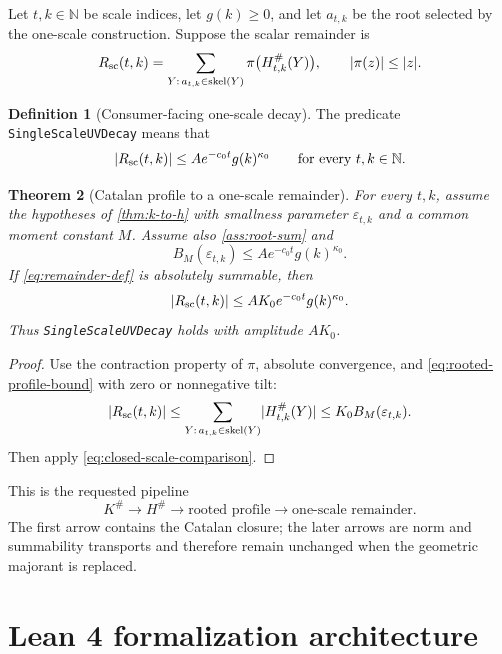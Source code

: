 \documentclass[11pt,a4paper]{article}
\newtheorem{theorem}{Theorem}[section]
\theoremstyle{definition}
\newtheorem{definition}[theorem]{Definition}
\newcommand{\skel}{\operatorname{skel}}
\newcommand{\eps}{\varepsilon}
\newcommand{\Hsharp}{H^{\#}}
\newcommand{\Ksharp}{K^{\#}}
\newcommand{\NN}{\mathbb N}
\DeclarePairedDelimiter{\abs}{\lvert}{\rvert}
\begin{document}
Let $t,k\in\NN$ be scale indices, let $g(k)\ge0$, and let $a_{t,k}$ be the root selected
by the one-scale construction.  Suppose the scalar remainder is
\begin{equation}
  R_{\mathrm{sc}}(t,k)
  =\sum_{Y:\,a_{t,k}\in\skel(Y)}
      \pi\bigl(\Hsharp_{t,k}(Y)\bigr),
  \qquad \abs{\pi(z)}\le\abs{z}.
  \label{eq:remainder-def}
\end{equation}

\begin{definition}[Consumer-facing one-scale decay]
The predicate \texttt{SingleScaleUVDecay} means that
\begin{equation}
  \abs{R_{\mathrm{sc}}(t,k)}
  \le A e^{-c_0t}g(k)^{\kappa_0}
  \qquad\text{for every }t,k\in\NN.
  \label{eq:ssuv}
\end{equation}
\end{definition}

\begin{theorem}[Catalan profile to a one-scale remainder]
\label{thm:single-scale}
For every $t,k$, assume the hypotheses of \cref{thm:k-to-h} with smallness parameter
$\eps_{t,k}$ and a common moment constant $M$.  Assume also \cref{ass:root-sum} and
\[
  B_M(\eps_{t,k})\le A e^{-c_0t}g(k)^{\kappa_0}.
  \label{eq:closed-scale-comparison}
\]
If \eqref{eq:remainder-def} is absolutely summable, then
\begin{equation}
  \abs{R_{\mathrm{sc}}(t,k)}
  \le AK_0e^{-c_0t}g(k)^{\kappa_0}.
  \label{eq:remainder-bound}
\end{equation}
Thus \texttt{SingleScaleUVDecay} holds with amplitude $AK_0$.
\end{theorem}

\begin{proof}
Use the contraction property of $\pi$, absolute convergence, and
\eqref{eq:rooted-profile-bound} with zero or nonnegative tilt:
\[
 \abs{R_{\mathrm{sc}}(t,k)}
 \le\sum_{Y:\,a_{t,k}\in\skel(Y)}\abs{\Hsharp_{t,k}(Y)}
 \le K_0B_M(\eps_{t,k}).
\]
Then apply \eqref{eq:closed-scale-comparison}.
\end{proof}

This is the requested pipeline
\[
  \Ksharp\longrightarrow\Hsharp
  \longrightarrow\text{rooted profile}
  \longrightarrow\text{one-scale remainder}.
\]
The first arrow contains the Catalan closure; the later arrows are norm and summability
transports and therefore remain unchanged when the geometric majorant is replaced.

\section{Lean 4 formalization architecture}
\label{sec:lean}
\end{document}
